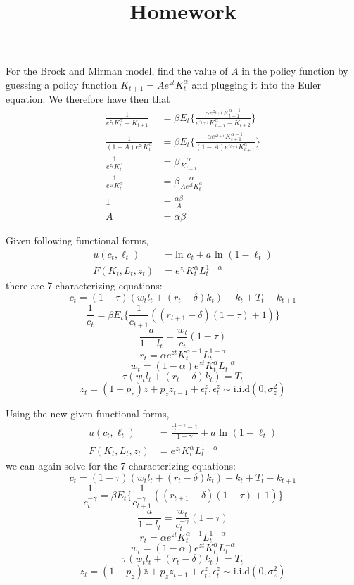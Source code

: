 \documentclass[12pt]{article}
\title{Homework}
\newenvironment{problem}[2][Problem]{\begin{trivlist}
\item[\hskip \labelsep {\bfseries #1}\hskip \labelsep {\bfseries #2}]}{\end{trivlist}}
\begin{document}
\begin{problem}{1.} 
For the Brock and Mirman model, find the value of $A$ in the policy function by guessing a policy function $K_{t+1} = Ae^{zt}K_t^\alpha$ and plugging it into the Euler equation. We therefore have then that 
\begin{align*}
\frac{1}{ e^{z_t} K_t^\alpha - K_{t+1}} &= \beta E_t \big\{\frac{\alpha e^{z_{t+1}} K_{t+1}^{\alpha-1}}{e^{z_{t+1}}K_{t+1}^\alpha - K_{t+2}}\big\} \\
\frac{1}{ (1-A)e^{z_t} K_t^\alpha} &= \beta E_t \big\{\frac{\alpha e^{z_{t+1}} K_{t+1}^{\alpha-1}}{(1-A)e^{z_{t+1}}K_{t+1}^\alpha}\big\} \\
\frac{1}{ e^{z_t} K_t^\alpha} &= \beta \frac{\alpha}{K_{t+1}}\\
\frac{1}{ e^{z_t} K_t^\alpha} &= \beta \frac{\alpha}{Ae^{zt}K_t^\alpha}\\
1 &= \frac{\alpha \beta}{A}\\
A &= \alpha\beta
\end{align*}
\end{problem}

\begin{problem}{2.}
Given following functional forms,
\begin{equation}
\begin{split}
u(c_t,\ell_t) & = \text{ln }c_t + a \text{ ln }(1-\ell_t)\\
F(K_t,L_t,z_t) & = e^{z_t}K^{\alpha}_t L^{1-\alpha}_t  \nonumber
\end{split}
\end{equation}
there are 7 characterizing equations:
$$c_t = (1-\tau)(w_tl_t + (r_t -\delta)k_t) + k_t + T_t - k_{t+1}$$
$$\frac{1}{c_t} = \beta E_t \big\{ \frac{1}{c_{t+1}}((r_{t+1} - \delta)(1-\tau)+ 1) \big\}$$
$$\frac{a}{1-l_t} = \frac{w_t}{c_t}(1-\tau)$$
$$r_t = \alpha e^{zt}K_t^{\alpha-1} L_t^{1-\alpha}$$
$$w_t = (1-\alpha) e^{zt}K_t^{\alpha} L_t^{-\alpha}$$
$$\tau(w_tl_t + (r_t -\delta)k_t) = T_t$$
$$z_t = (1-p_z)\bar{z} + p_zz_{t-1} + \epsilon^z_t,  \epsilon^z_t \sim \text{i.i.d}(0, \sigma^2_z)$$
\end{problem}

\begin{problem}{3.}
Using the new given functional forms,
\begin{equation}\label{DSGE_HW_CharEq_CES_Ln_eq01}
\begin{split}
u(c_t,\ell_t) & = \frac{c^{1-\gamma}_t -1}{1-\gamma}+ a \text{ ln }(1-\ell_t)\\
F(K_t,L_t,z_t) & = e^{z_t}K^{\alpha}_t L^{1-\alpha}_t  \nonumber
\end{split}
\end{equation}
we can again solve for the 7 characterizing equations:
$$c_t = (1-\tau)(w_tl_t + (r_t -\delta)k_t) + k_t + T_t - k_{t+1}$$
$$\frac{1}{c_t^{-\gamma}} = \beta E_t \big\{ \frac{1}{c_{t+1}^{-\gamma}}((r_{t+1} - \delta)(1-\tau)+ 1) \big\}$$
$$\frac{a}{1-l_t} = \frac{w_t}{c_t^{-\gamma}}(1-\tau)$$
$$r_t = \alpha e^{zt}K_t^{\alpha-1} L_t^{1-\alpha}$$
$$w_t = (1-\alpha) e^{zt}K_t^{\alpha} L_t^{-\alpha}$$
$$\tau(w_tl_t + (r_t -\delta)k_t) = T_t$$
$$z_t = (1-p_z)\bar{z} + p_zz_{t-1} + \epsilon^z_t,  \epsilon^z_t \sim \text{i.i.d}(0, \sigma^2_z)$$
\end{problem}
\end{document}
